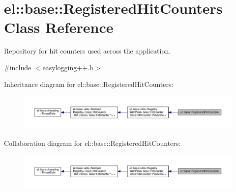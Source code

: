 \hypertarget{classel_1_1base_1_1_registered_hit_counters}{}\section{el\+:\+:base\+:\+:Registered\+Hit\+Counters Class Reference}
\label{classel_1_1base_1_1_registered_hit_counters}


Repository for hit counters used across the application.  




{\ttfamily \#include $<$easylogging++.\+h$>$}



Inheritance diagram for el\+:\+:base\+:\+:Registered\+Hit\+Counters\+:
\nopagebreak
\begin{figure}[H]
\begin{center}
\leavevmode
\includegraphics[width=350pt]{classel_1_1base_1_1_registered_hit_counters__inherit__graph}
\end{center}
\end{figure}


Collaboration diagram for el\+:\+:base\+:\+:Registered\+Hit\+Counters\+:
\nopagebreak
\begin{figure}[H]
\begin{center}
\leavevmode
\includegraphics[width=350pt]{classel_1_1base_1_1_registered_hit_counters__coll__graph}
\end{center}
\end{figure}
